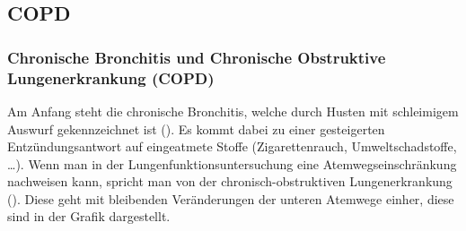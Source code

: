 \documentclass[
ngerman,
paper=a4,
asymmetric,
fontsize=10pt,
draft=false,
numbers=noenddot,
bibtotocnumbered,
footnotes=multiple,
]{scrreprt}
\newcommand{\jALT}{\vspace{6pt}\noindent{\color{red}\sffamily\textbf{DELETED}\hrulefill\newline}}
\begin{document}
\subsection{COPD}
\jALT
\subsubsection{Chronische Bronchitis und 
Chronische Obstruktive Lungenerkrankung
(COPD)}

 Am Anfang steht die chronische Bronchitis, welche durch
 Husten mit schleimigem Auswurf gekennzeichnet ist
({}). Es kommt dabei zu einer gesteigerten
 Entzündungsantwort auf eingeatmete Stoffe (Zigarettenrauch,
 Umweltschadstoffe, \ldots). Wenn man in der
Lungenfunktionsuntersuchung eine Atemwegseinschränkung
 nachweisen kann, spricht man von der chronisch-obstruktiven
 Lungenerkrankung (). 
 Diese geht mit bleibenden Veränderungen der unteren Atemwege einher, 
 diese sind in der Grafik   dargestellt.
 
% 
\end{document}

